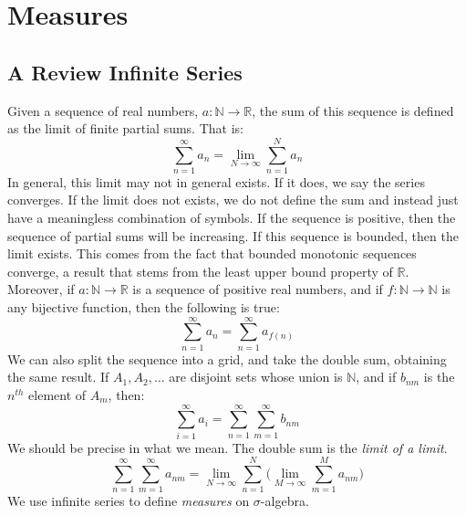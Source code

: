 \section{Measures}
    \subsection{A Review Infinite Series}
        Given a sequence of real numbers,
        $a:\mathbb{N}\rightarrow\mathbb{R}$, the sum of this
        sequence is defined as the limit of
        finite partial sums. That is:
        \begin{equation}
            \sum_{n=1}^{\infty}a_{n}=
            \underset{N\rightarrow\infty}{\lim}
                \sum_{n=1}^{N}a_{n}
        \end{equation}
        In general, this limit may not in general exists. If it
        does, we say the series converges. If the limit does
        not exists, we do not define the sum and instead just
        have a meaningless combination of symbols. If the
        sequence is positive, then the sequence of partial sums
        will be increasing. If this sequence is bounded, then
        the limit exists. This comes from the fact that bounded
        monotonic sequences converge, a result that stems from
        the least upper bound property of $\mathbb{R}$.
        Moreover, if $a:\mathbb{N}\rightarrow\mathbb{R}$ is a
        sequence of positive real numbers, and if
        $f:\mathbb{N}\rightarrow\mathbb{N}$ is any bijective
        function, then the following is true:
        \begin{equation}
            \sum_{n=1}^{\infty}a_{n}
            =\sum_{n=1}^{\infty}a_{f(n)}
        \end{equation}
        We can also split the sequence into a grid,
        and take the
        double sum, obtaining the same result. If
        $A_{1},A_{2},\hdots$ are disjoint sets whose union is
        $\mathbb{N}$, and if $b_{nm}$ is the $n^{th}$ element
        of $A_{m}$, then:
        \begin{equation}
            \sum_{i=1}^{\infty}a_{i}=
            \sum_{n=1}^{\infty}\sum_{m=1}^{\infty}b_{nm}
        \end{equation}
        We should be precise in what we mean. The double
        sum is the \textit{limit of a limit}.
        \begin{equation}
            \sum_{n=1}^{\infty}\sum_{m=1}^{\infty}a_{nm}
            =\underset{N\rightarrow\infty}{\lim}\sum_{n=1}^{N}
            \Big(\underset{M\rightarrow\infty}{\lim}
            \sum_{m=1}^{M}a_{nm}\Big)
        \end{equation}
        We use infinite series to define \textit{measures} on
        $\sigma$-algebra.
